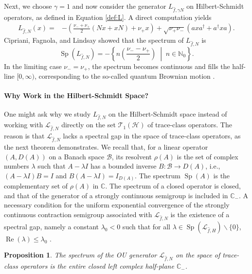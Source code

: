 \documentclass[11pt]{amsart}
\newcommand{\1}{\mathbbm{1}}
\theoremstyle{plain}
\newtheorem{proposition}[theorem]{Proposition}
\theoremstyle{definition}
\theoremstyle{remark}
\numberwithin{equation}{section}
\begin{document}
\smallskip
 
 Next, we choose $\gamma=1$ and now consider the generator $L_{\widehat{f},\gamma N}$ on Hilbert-Schmidt operators, as defined in Equation \eqref{def:L}. A direct computation yields \cite{OU}
\begin{align}
  \label{eq:HSgenerator}
L_{\widehat{f},N}(x) =& -\left( \frac{\nu_- + \nu_+}{2}(Nx + xN) + \nu_+ x \right)  + \sqrt{\nu_+ \nu_-}( a x a^{\dagger} +  a^{\dagger} x a) .
\end{align}
Cipriani, Fagnola, and Lindsay \cite[Thm.~7.2]{OU} showed that the spectrum of \( L_{\widehat{f},N} \) is
\[
\operatorname{Sp}(L_{\widehat{f},N}) = -\left\{ n\left( \frac{\nu_- - \nu_+}{2} \right) \;\middle|\; n \in \mathbb{N}_0 \right\}.
\]
In the limiting case \( \nu_- = \nu_+ \), the spectrum becomes continuous and fills the half-line \( [0, \infty) \), corresponding to the so-called quantum Brownian motion \cite[Thm. 8.1]{OU}.


\smallskip

\paragraph{Why Work in the Hilbert-Schmidt Space?}
One might ask why we study \( L_{\widehat{f},N} \) on the Hilbert-Schmidt space instead of working with \( \mathcal{L}_{\widehat{f},N} \) directly on the set \( \mathscr{T}_1(\mathcal{H}) \) of trace-class operators. The reason is that \( \mathcal{L}_{\widehat{f},N} \) lacks a spectral gap in the space of trace-class operators, as the next theorem demonstrates. We recall that, for a linear operator $(A,D(A))$ on a Banach space $\mathscr{B}$, its resolvent $\rho(A)$ is the set of complex numbers $\lambda$ such that $A-\lambda I$ has a bounded inverse $B:\mathscr{B}\to D(A)$, i.e., $(A-\lambda I)B=I$ and $B(A-\lambda I)=I_{D(A)}$. The spectrum $\operatorname{Sp}(A)$ is the complementary set of $\rho(A)$ in $\mathbb{C}$. The spectrum of a closed operator is closed, and that of the generator of a strongly continuous semigroup is included in $\mathbb{C}_-$. A necessary condition for the uniform exponential convergence of the strongly continuous contraction semigroup associated with $\mathcal{L}_{\widehat{f},N}$ is the existence of a spectral gap, namely a constant $\lambda_0<0$ such that for all $\lambda\in \operatorname{Sp}(\mathcal{L}_{\widehat{f},H})\backslash \{0\}$, $\operatorname{Re}(\lambda)\le \lambda_0$ \cite[Corollary 4.1.2]{salzmann2024robustness}.


\begin{proposition}\label{thm.qOUnogap}
The spectrum of the OU generator \( \mathcal{L}_{\widehat{f},N} \) on the space of trace-class operators is the entire closed left complex half-plane \( \mathbb{C}_- \).
\end{proposition}
\end{document}
